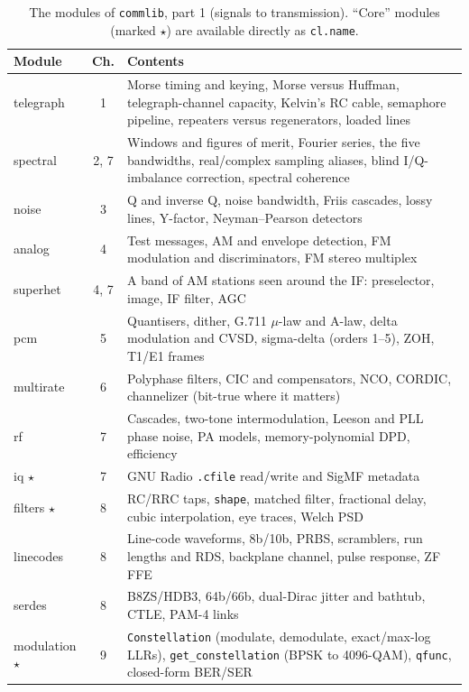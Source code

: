 \begin{table}[htbp]\centering\footnotesize
\caption{The modules of \texttt{commlib}, part 1 (signals to transmission). ``Core'' modules
(marked $\star$) are available directly as \texttt{cl.name}.}\label{tab:appB:modules}
\renewcommand{\arraystretch}{1.0}
\begin{tabularx}{\linewidth}{@{}>{\ttfamily}lc>{\raggedright\arraybackslash}X@{}}
\toprule
\normalfont Module & Ch. & Contents\\
\midrule
telegraph & 1 & Morse timing and keying, Morse versus Huffman, telegraph-channel capacity, Kelvin's RC cable, semaphore pipeline, repeaters versus regenerators, loaded lines\\
spectral & 2, 7 & Windows and figures of merit, Fourier series, the five bandwidths, real/complex sampling aliases, blind I/Q-imbalance correction, spectral coherence\\
noise & 3 & Q and inverse Q, noise bandwidth, Friis cascades, lossy lines, Y-factor, Neyman--Pearson detectors\\
analog & 4 & Test messages, AM and envelope detection, FM modulation and discriminators, FM stereo multiplex\\
superhet & 4, 7 & A band of AM stations seen around the IF: preselector, image, IF filter, AGC\\
pcm & 5 & Quantisers, dither, G.711 $\mu$-law and A-law, delta modulation and CVSD, sigma-delta (orders 1--5), ZOH, T1/E1 frames\\
multirate & 6 & Polyphase filters, CIC and compensators, NCO, CORDIC, channelizer (bit-true where it matters)\\
rf & 7 & Cascades, two-tone intermodulation, Leeson and PLL phase noise, PA models, memory-polynomial DPD, efficiency\\
iq $\star$ & 7 & GNU Radio \texttt{.cfile} read/write and SigMF metadata\\
filters $\star$ & 8 & RC/RRC taps, \texttt{shape}, matched filter, fractional delay, cubic interpolation, eye traces, Welch PSD\\
linecodes & 8 & Line-code waveforms, 8b/10b, PRBS, scramblers, run lengths and RDS, backplane channel, pulse response, ZF FFE\\
serdes & 8 & B8ZS/HDB3, 64b/66b, dual-Dirac jitter and bathtub, CTLE, PAM-4 links\\
modulation $\star$ & 9 & \texttt{Constellation} (modulate, demodulate, exact/max-log LLRs), \texttt{get\_constellation} (BPSK to 4096-QAM), \texttt{qfunc}, closed-form BER/SER\\

\end{tabularx}
\end{table}
